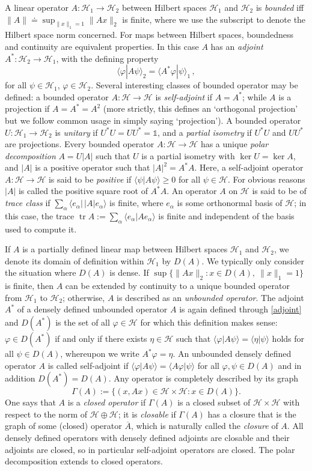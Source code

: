 \documentclass[12pt,a4paper]{article}
\newcommand{\1}{\mathds{1}}                         %
\newcommand{\Hcal}{\mathcal {H}}
\newcommand{\HH}{{\mathcal{H}}}
\newcommand{\II}{{\mathbb{1}}}
\newcommand{\ph}{\varphi}
\newcommand{\ip}[2]{\langle #1|#2\rangle}
\newcommand{\be}{\begin{equation}}
\newcommand{\ee}{\end{equation}}
\DeclareMathOperator{\tr}{tr}
\begin{document}
A linear operator $A:\HH_1\to\HH_2$ between Hilbert spaces $\HH_1$ and $\HH_2$ is \emph{bounded} iff $\|A\|\doteq \sup_{\|x\|_1=1} \|Ax\|_2$ is finite, where we use the subscript to denote the Hilbert space norm concerned. For maps between Hilbert spaces, boundedness and continuity are equivalent properties. In this case $A$ has an \emph{adjoint} $A^*:\HH_2\to\HH_1$, with the defining property 
\be\label{adjoint}
\ip{\ph}{A\psi}_2=\ip{A^*\ph}{\psi}_1\,,
\ee
for all $\psi\in\HH_1$, $\ph\in\HH_2$. Several interesting classes of bounded operator may be defined: a bounded operator $A:\HH\to\HH$ is \emph{self-adjoint} if $A=A^*$; while $A$ is a projection if $A=A^*=A^2$ (more strictly, this defines an `orthogonal projection' but we follow common usage in simply saying `projection'). A bounded operator $U:\HH_1\to\HH_2$ is \emph{unitary} if $U^*U = UU^* = \II$, and a \emph{partial isometry} if $U^*U$ and $UU^*$ are projections.  Every bounded operator $A:\HH\to\HH$ has a unique \emph{polar decomposition} $A = U|A|$ such that $U$ is a partial isometry with $\ker U=\ker A$, and $|A|$ is a positive operator such that $|A|^2 = A^*A$. Here, a self-adjoint operator $A:\HH\to\HH$ is said to be \emph{positive} if $\ip{\psi}{A\psi}\ge 0$ for all $\psi\in\HH$. For obvious reasons $|A|$ is called the positive square root of $A^*A$. An operator $A$ on $\HH$ is said to be of \emph{trace class} if
$\sum_{\alpha} \ip{e_\alpha}{\,|A|e_\alpha}$ is finite, where $e_\alpha$ is some
orthonormal basis of $\HH$; in this case, the trace $\tr A := \sum_{\alpha} \ip{e_\alpha}{A e_\alpha}$ is finite and independent of the basis used to compute it. 

If $A$ is a partially defined linear map between Hilbert spaces $\HH_1$ and $\HH_2$, 
we denote its domain of definition within $\HH_1$ by $D(A)$. We typically only consider the situation where $D(A)$ is dense. If $\sup\{\|Ax\|_2:x\in D(A),~\|x\|_1=1\}$ is finite, then $A$ can be extended by continuity to a unique bounded operator from $\HH_1$ to $\HH_2$; otherwise, $A$ is described as an \emph{unbounded operator}. The adjoint $A^*$ of a densely defined unbounded operator $A$ is again defined through \eqref{adjoint} and $D(A^*)$ is the set of all $\ph\in\Hcal$ for which this definition makes sense: $\varphi\in D(A^*)$ if and only if there exists $\eta\in\Hcal$ such that $\ip{\ph}{A\psi}=\ip{\eta}{\psi}$ holds for all $\psi\in D(A)$, whereupon we write $A^*\varphi=\eta$. An unbounded densely defined operator $A$ is called self-adjoint if $\ip{\ph}{A\psi}=\ip{A\ph}{\psi}$ for all $\ph,\psi\in D(A)$ and in addition $D(A^*)= D(A)$.
Any operator is completely described by its graph 
\[
\Gamma(A):=\{(x,Ax)\in \HH\times\HH: x\in D(A)\}.
\]
One says that $A$ is a \emph{closed operator} if $\Gamma(A)$ is a closed subset of $\HH\times\HH$ with respect to the norm of $\HH\oplus\HH$; it is \emph{closable} if $\Gamma(A)$ has a closure that is the graph of some (closed) operator $\overline{A}$, which is naturally called the \emph{closure} of $A$. All densely defined operators with densely defined adjoints are closable and their adjoints are closed, so in particular self-adjoint operators are closed. The polar decomposition extends to closed operators. 
 
\end{document}
